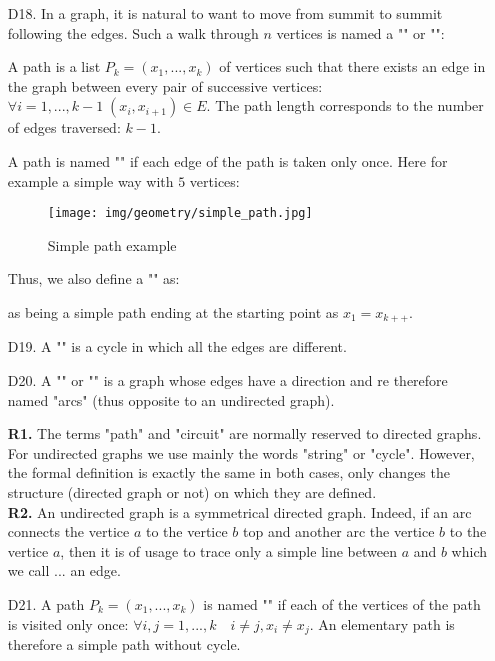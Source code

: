 {\begin{enumerate}
	\item[D18.] In a graph, it is natural to want to move from summit to summit following the edges. Such a walk through $n$ vertices is named a ""  or "":
	
	A path is a list $P_k=(x_1,...,x_k)$ of vertices such that there exists an edge in the graph between every pair of successive vertices: $\forall i=1,...,k-1\; (x_i,x_{i+1})\in E$. The path length corresponds to the number of edges traversed: $k-1$.
	
	A path is named "" if each edge of the path is taken only once. Here for example a simple way with $5$ vertices:
	\begin{figure}[H]
		\centering
		\texttt{[image: img/geometry/simple\_path.jpg]}
		\caption{Simple path example}
	\end{figure}
	Thus, we also define a "" as:
	
	as being a simple path ending at the starting point as $x_1=x_{k++}$. 
	
	\item[D19.] A "" is a cycle in which all the edges are different.
	
	\item[D20.] A "" or "" is a graph whose edges have a direction and re therefore named "arcs" (thus opposite to an undirected graph).
	
	\begin{tcolorbox}[title=Remarks,colframe=black,arc=10pt]
	\textbf{R1.} The terms "path" and "circuit" are normally reserved to directed graphs. For undirected graphs we use mainly the words "string" or "cycle". However, the formal definition is exactly the same in both cases, only changes the structure (directed graph or not) on which they are defined.\\
	
	\textbf{R2.} An undirected graph is a symmetrical directed graph. Indeed, if an arc connects the vertice $a$ to the vertice $b$ top and another arc the vertice $b$ to the vertice $a$, then it is of usage to trace only a simple line between $a$ and $b$ which we call ... an edge.
	\end{tcolorbox}
	
	 \item[D21.] A path $P_k=(x_1,...,x_k)$ is named "" if each of the vertices of the path is visited only once: $\forall i,j=1,...,k \quad i\neq j,x_i \neq x_j$. An elementary path is therefore a simple path without cycle.
	 

\end{enumerate}}
